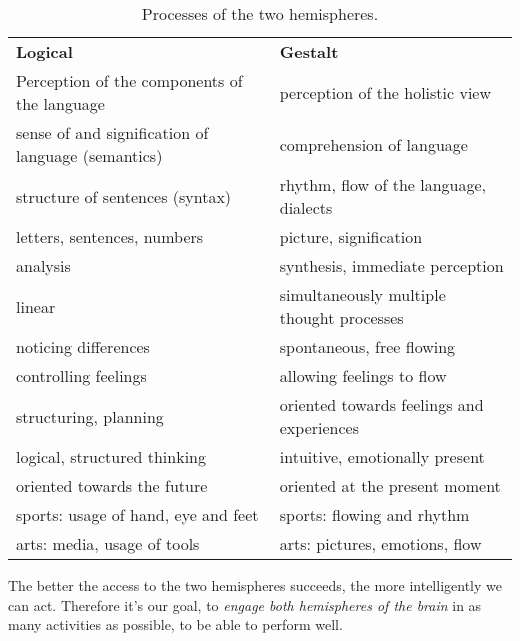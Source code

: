 \documentclass[../main.tex]{subfiles}
\begin{document}
\begin{table}[htb]
  \centering
  \begin{tabular}{p{5.5cm}p{5.5cm}}
    \textbf{Logical} & \textbf{Gestalt} \\
    Perception of the components of the language & perception of the holistic view \\
    sense of and signification of language (semantics) & comprehension of language \\
    structure of sentences (syntax) & rhythm, flow of the language, dialects \\
    letters, sentences, numbers & picture, signification \\
    analysis & synthesis, immediate perception \\
    linear & simultaneously multiple thought processes \\
    noticing differences & spontaneous, free flowing \\
    controlling feelings & allowing feelings to flow \\
    structuring, planning & oriented towards feelings and experiences \\
    logical, structured thinking & intuitive, emotionally present \\
    oriented towards the future & oriented at the present moment \\
    sports: usage of hand, eye and feet & sports: flowing and rhythm \\
    arts: media, usage of tools & arts: pictures, emotions, flow \\
  \end{tabular}
  \caption{Processes of the two hemispheres.}
\end{table}

The better the access to the two hemispheres succeeds, the more intelligently we can act.
Therefore it's our goal, to \emph{engage both hemispheres of the brain} in as many activities as possible, to be able to perform well.

\vspace{1cm}

\end{document}
